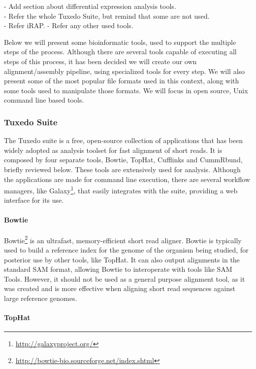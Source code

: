 \begin{Notes}
- Add section about differential expression analysis tools.\\
- Refer the whole Tuxedo Suite, but remind that some are not used.\\
- Refer iRAP.
- Refer any other used tools.
\end{Notes}

Below we will present some bioinformatic tools, used to support the multiple
steps of the \rnaseq{} process. Although there are several tools capable of
executing all steps of this process, it has been decided we will create our own
alignment/assembly pipeline, using specialized tools for every step. We will also present
some of the most popular file formats used in this context, along with some
tools used to manipulate those formats. We will focus in open source, Unix
command line based tools.

\subsubsection*{Tuxedo Suite}

The Tuxedo suite is a free, open-source collection of applications that has been
widely adopted as analysis toolset for fast alignment of short reads. It is
composed by four separate tools, Bowtie, TopHat, Cufflinks and CummRbund,
briefly reviewed below. These tools are extensively used for \rnaseq{} analysis.
Although the applications are made for command line execution, there are several
workflow managers, like Galaxy\footnote{\url{http://galaxyproject.org/}}, that
easily integrates with the suite, providing a web interface for its use.

\paragraph{Bowtie}

Bowtie\footnote{\url{http://bowtie-bio.sourceforge.net/index.shtml}} is an
ultrafast, memory-efficient short read aligner. Bowtie is typically used to
build a reference index for the genome of the organism being studied, for
posterior use by other tools, like TopHat. It can also output alignments in the
standard SAM format, allowing Bowtie to interoperate with tools like SAM Tools.
However, it should not be used as a general purpose alignment tool, as it was
created and is more effective when aligning short read sequences against large
reference genomes.

\paragraph{TopHat}

